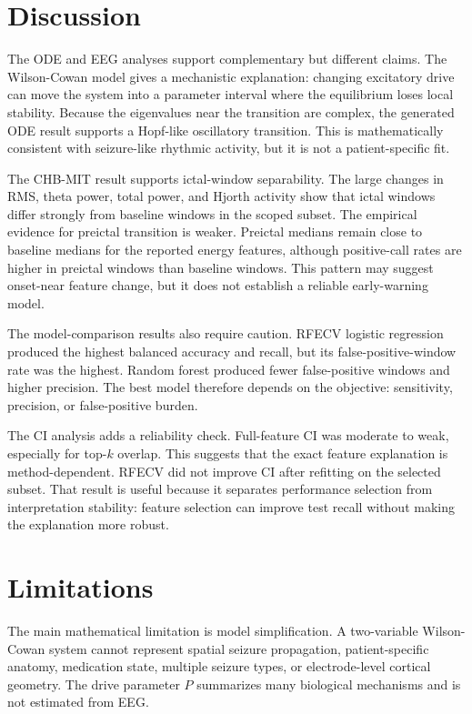\documentclass[11pt]{article}
\begin{document}
\section{Discussion}

The ODE and EEG analyses support complementary but different claims. The Wilson-Cowan model gives a mechanistic explanation: changing excitatory drive can move the system into a parameter interval where the equilibrium loses local stability. Because the eigenvalues near the transition are complex, the generated ODE result supports a Hopf-like oscillatory transition. This is mathematically consistent with seizure-like rhythmic activity, but it is not a patient-specific fit.

The CHB-MIT result supports ictal-window separability. The large changes in RMS, theta power, total power, and Hjorth activity show that ictal windows differ strongly from baseline windows in the scoped subset. The empirical evidence for preictal transition is weaker. Preictal medians remain close to baseline medians for the reported energy features, although positive-call rates are higher in preictal windows than baseline windows. This pattern may suggest onset-near feature change, but it does not establish a reliable early-warning model.

The model-comparison results also require caution. RFECV logistic regression produced the highest balanced accuracy and recall, but its false-positive-window rate was the highest. Random forest produced fewer false-positive windows and higher precision. The best model therefore depends on the objective: sensitivity, precision, or false-positive burden.

The CI analysis adds a reliability check. Full-feature CI was moderate to weak, especially for top-$k$ overlap. This suggests that the exact feature explanation is method-dependent. RFECV did not improve CI after refitting on the selected subset. That result is useful because it separates performance selection from interpretation stability: feature selection can improve test recall without making the explanation more robust.

\section{Limitations}

The main mathematical limitation is model simplification. A two-variable Wilson-Cowan system cannot represent spatial seizure propagation, patient-specific anatomy, medication state, multiple seizure types, or electrode-level cortical geometry. The drive parameter $P$ summarizes many biological mechanisms and is not estimated from EEG.
\end{document}

